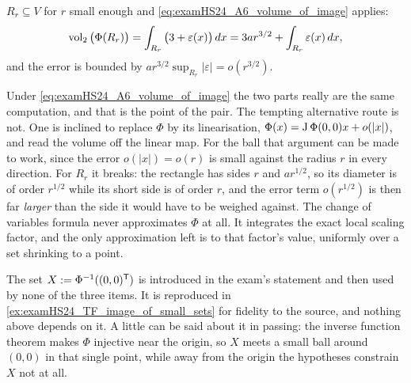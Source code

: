 \begin{exercisesolution}
\begin{enumerate}[label=\textbf{(\alph*)}]
    $R_r \subseteq V$ for $r$ small enough and \eqref{eq:examHS24_A6_volume_of_image} applies:
    \[\operatorname{vol}_2\big(\Phi(R_r)\big) = \int_{R_r} \big(3 + \varepsilon(x)\big)\,dx
      = 3ar^{3/2} + \int_{R_r} \varepsilon(x)\,dx ,\]
    and the error is bounded by $ar^{3/2}\sup_{R_r}\lvert\varepsilon\rvert = o(r^{3/2})$.
\end{enumerate}
\begin{remark}
Under \eqref{eq:examHS24_A6_volume_of_image} the two parts really are the same computation, and
that is the point of the pair. The tempting alternative route is not. One is inclined to replace
$\Phi$ by its linearisation, $\Phi(x) = \operatorname{J}\Phi(0,0)x + o(\lvert x\rvert)$, and read the volume
off the linear map. For the ball that argument can be made to work, since the error
$o(\lvert x\rvert) = o(r)$ is small against the radius $r$ in every direction. For $R_r$ it breaks:
the rectangle has sides $r$ and $ar^{1/2}$, so its diameter is of order $r^{1/2}$ while its short
side is of order $r$, and the error term $o(r^{1/2})$ is then far \emph{larger} than the side it
would have to be weighed against. The change of variables formula never approximates $\Phi$ at all.
It integrates the exact local scaling factor, and the only approximation left is to that factor's
value, uniformly over a set shrinking to a point.
\end{remark}
\begin{ainote}
The set $X := \Phi^{-1}((0,0)^{\mathsf{T}})$ is introduced in the exam's statement and then used by none
of the three items. It is reproduced in \cref{ex:examHS24_TF_image_of_small_sets} for fidelity to
the source, and nothing above depends on it. A little can be said about it in passing: the inverse
function theorem makes $\Phi$ injective near the origin, so $X$ meets a small ball around $(0,0)$
in that single point, while away from the origin the hypotheses constrain $X$ not at all.
\end{ainote}
\end{exercisesolution}


